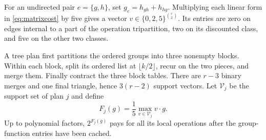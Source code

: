 \documentclass[11pt]{article}
\theoremstyle{remark}\newtheorem{remark}[theorem]{Remark}
\begin{document}
For an undirected pair $e=\{g,h\}$, set $g_e=h_{gh}+h_{hg}$. Multiplying
each linear form in \eqref{eq:matrixcost} by five gives a vector
$v\in\{0,2,5\}^{\binom r2}$. Its entries are zero on edges internal to a
part of the operation tripartition, two on its discounted class, and five
on the other two classes.

A tree plan first partitions the ordered groups into three nonempty blocks.
Within each block, split its ordered list at $\lfloor k/2\rfloor$, recur on
the two pieces, and merge them. Finally contract the three block tables.
There are $r-3$ binary merges and one final triangle, hence $3(r-2)$ support
vectors. Let $\mathcal V_j$ be the support set of plan $j$ and define
\begin{equation}
 F_j(g)=\frac15\max_{v\in\mathcal V_j}v\cdot g.
 \label{eq:Fj}
\end{equation}
Up to polynomial factors, $2^{F_j(g)}$ pays for all its local operations
after the group-function entries have been cached.
\end{document}
